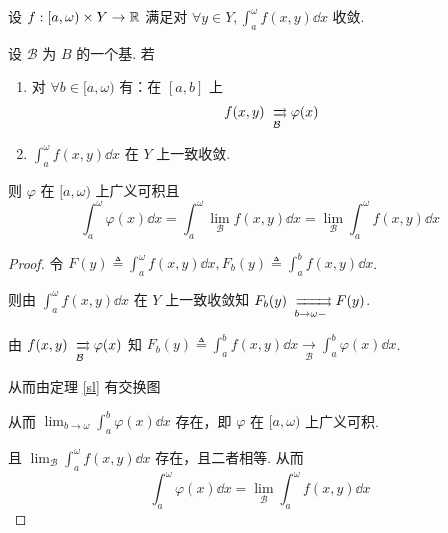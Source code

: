 \begin{property}
    设 $f:[a,\omega)\times Y\to\mathbb{R}$ 满足对 $\forall y\in Y,\displaystyle\int_a^\omega f(x,y)\dd x$ 收敛.

    设 $\mathcal{B}$ 为 $B$ 的一个基. 若

    \begin{enumerate}
        \item 对 $\forall b\in[a,\omega)$ 有：在 $[a,b]$ 上
$$
f(x,y)\xrightrightarrows[\mathcal{B}]{}{\varphi(x)}
$$

        \item $\displaystyle\int_a^\omega f(x,y)\dd x$ 在 $Y$ 上一致收敛.
    \end{enumerate}

    则 $\varphi$ 在 $[a,\omega)$ 上广义可积且
$$
\int_a^\omega\varphi(x)\dd x=\int_a^\omega\lim_{\mathcal{B}}f(x,y)\dd x=\lim_{\mathcal{B}}\int_a^\omega f(x,y)\dd x
$$
\end{property}
\begin{proof}
    令 $F(y)\triangleq\displaystyle\int_a^\omega f(x,y)\dd x,F_b(y)\triangleq\int_a^bf(x,y)\dd x$.

    则由 $\displaystyle\int_a^\omega f(x,y)\dd x$ 在 $Y$ 上一致收敛知 $F_b(y)\xrightrightarrows[b\to\omega-]{} F(y)$.

    由 $f(x,y)\xrightrightarrows[\mathcal{B}]{}\varphi(x)$ 知 $F_b(y)\triangleq\displaystyle\int_a^bf(x,y)\dd x\xrightarrow[\mathcal{B}]{}\int_a^b\varphi(x)\dd x$.

    从而由定理 \ref{sl} 有交换图
    
    \begin{center}
    \end{center}

    从而 $\displaystyle\lim_{b\to\omega}\int_a^b\varphi(x)\dd x$ 存在，即 $\varphi$ 在 $[a,\omega)$ 上广义可积.

    且 $\displaystyle\lim_{\mathcal{B}}\int_a^\omega f(x,y)\dd x$ 存在，且二者相等. 从而
$$
\int_a^\omega\varphi(x)\dd x=\lim_{\mathcal{B}}\int_a^\omega f(x,y)\dd x
$$
\end{proof}

